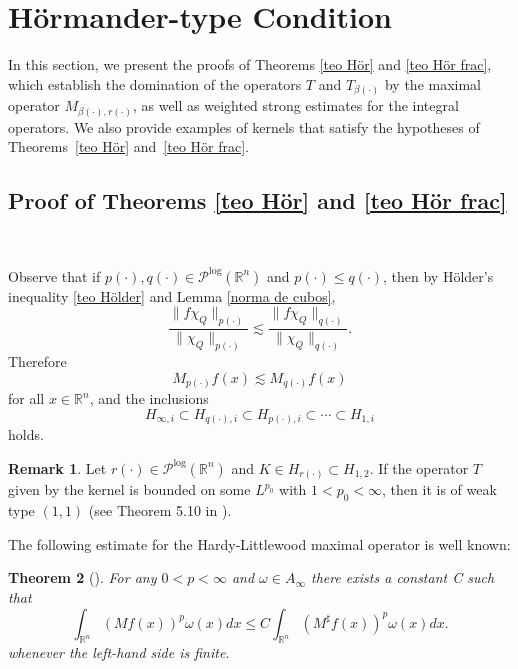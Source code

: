 \documentclass[a4paper,11pt,reqno]{amsart}
\theoremstyle{plain}
\numberwithin{equation}{section}
\newtheorem{teo}{Theorem}[section]
\theoremstyle{definition}
\newtheorem{remark}[teo]{Remark}
\newcommand{\R}{{\mathbb{R}^n}}
\begin{document}
 \section{Hörmander-type Condition}\label{sec 4}
In this section, we present the proofs of Theorems \ref{teo Hör} and \ref{teo Hör frac}, which establish the domination of the operators $T$ and $T_{\beta(\cdot)}$ by the maximal operator $M_{\beta(\cdot), r(\cdot)}$, as well as weighted strong estimates for the integral operators. We also provide examples of kernels that satisfy the hypotheses of Theorems~\ref{teo Hör} and~\ref{teo Hör frac}.
\subsection{Proof of Theorems \ref{teo Hör} and \ref{teo Hör frac}}

\

Observe that if $p(\cdot),q(\cdot)\in\mathcal{P}^{\text{log}}(\R)$ and ${p(\cdot)}\leq {q(\cdot)}$, then by Hölder's inequality \ref{teo Hölder} and Lemma \ref{norma de cubos}, 
	\begin{equation}\label{comparacion de promedios}
		\frac{\|f\chi_Q\|_{p(\cdot)}}{\|\chi_Q\|_{p(\cdot)}}\lesssim\frac{\|f\chi_Q\|_{q(\cdot)}}{\|\chi_Q\|_{q(\cdot)}}.
	\end{equation}
Therefore
	\begin{equation*}
	M_{p(\cdot)}f(x)\lesssim M_{q(\cdot)}f(x)	
	\end{equation*}
	for all $x\in\R$, and the inclusions 
	\begin{equation*}
	H_{\infty,i}\subset H_{q(\cdot),i}\subset H_{p(\cdot),i}\subset\cdots \subset H_{1,i}
	\end{equation*}
	 holds.

\begin{remark}\label{T es debil (1,1)}
	Let $r(\cdot)\in \mathcal{P}^\text{log}(\R)$ and $K\in H_{r(\cdot)}\subset H_{1,2}$. If the operator $T$ given by the kernel is bounded on some $L^{p_0}$ with $1<p_0<\infty$, then it is of weak type $(1,1)$ (see Theorem 5.10 in \cite{Duo}).
\end{remark}

The following estimate for the Hardy-Littlewood maximal operator is well known:
\begin{teo}[\cite{Garcia-Cuerva}]\label{teo sharp}For any $0<p<\infty$ and $\omega\in A_\infty$ there exists a constant C such that
\begin{equation*}
	\int_\R (Mf(x))^p\omega(x)dx\leq C	\int_\R \left(M^\sharp f(x)\right)^p\omega(x)dx.
\end{equation*}	
whenever the left-hand side is finite.
\end{teo}
\end{document}
